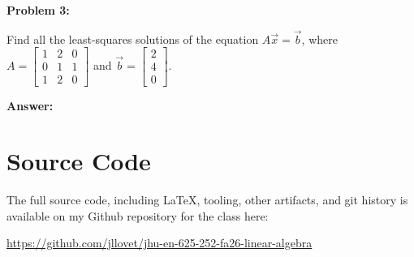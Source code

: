 \documentclass[10pt,letterpaper,final]{report}
\begin{document}
\pagebreak

\noindent\textbf{Problem 3:}
\medskip

Find all the least-squares solutions of the equation $A\vec{x} = \vec{b}$, where $A = \begin{bmatrix}
    1 & 2 & 0 \\
    0 & 1 & 1 \\
    1 & 2 & 0
  \end{bmatrix}$ and $\vec{b} = \begin{bmatrix}
    2 \\
    4 \\
    0
  \end{bmatrix}$.

\medskip
\noindent\textbf{Answer:}

\pagebreak

\section*{Source Code}
The full source code, including LaTeX, tooling, other artifacts, and git history is available on my Github repository for the class here:
\begin{center}
  \url{https://github.com/jllovet/jhu-en-625-252-fa26-linear-algebra}
\end{center}

\printbibliography
\end{document}
